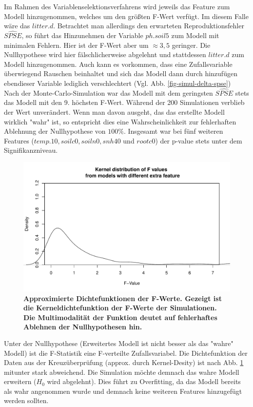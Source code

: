 Im Rahmen des Variablenselektionsverfahrens wird jeweils das Feature zum Modell hinzugenommen, welches um den größten F-Wert verfügt.
Im diesem Falle wäre das $litter.d$.
Betrachtet man allerdings den erwarteten Reproduktionsfehler $\widehat{SPSE}$, so führt das Hinzunehmen der Variable $ph.soil5$ zum Modell mit minimalen Fehlern.
Hier ist der F-Wert aber um $\approx 3,5$ geringer.
Die Nullhypothese wird hier fälschlicherweise abgelehnt und stattdessen $litter.d$ zum Modell hinzugenommen.
Auch kann es vorkommen, dass eine Zufallsvariable überwiegend Rauschen beinhaltet und sich das Modell dann durch hinzufügen ebendieser Variable lediglich verschlechtert (Vgl. Abb. \ref{fig-simul-delta-spse})
\\
Nach der Monte-Carlo-Simulation war das Modell mit dem geringsten $\widehat{SPSE}$ stets das Modell mit den 9. höchsten F-Wert.
Während der 200 Simulationen verblieb der Wert unverändert.
Wenn man davon ausgeht, das das erstellte Modell wirklich "wahr" ist, so entspricht dies eine Wahrscheinlichkeit zur fehlerhaften Ablehnung der Nullhypothese von $100\%$.
Insgesamt war bei fünf weiteren Features ($temp.10, soilc0, soiln0, snh40$ und $ rootc0$) der p-value stets unter dem Signifikanzniveau.
\\
\begin{figure}[htbp]
	\centering
	\includegraphics[width=\textwidth]{fig/simul/kernel.pdf}
	\caption{\bf{Approximierte Dichtefunktionen der F-Werte.} 
		Gezeigt ist die Kerneldichtefunktion der F-Werte der Simulationen.
		Die Multimodalität der Funktion deutet auf fehlerhaftes Ablehnen der Nullhypothesen hin.
	}
	\label{fig-simul-kernel}
\end{figure}
Unter der Nullhypothese (Erweitertes Modell ist nicht besser als das "wahre" Modell) ist die F-Statistik eine F-verteilte Zufallsvariabel.
Die Dichtefunktion der Daten aus der Kreuzüberprüfung (approx. durch Kernel-Desity) ist nach Abb. \ref{fig-simul-kernel} mitunter stark abweichend.
Die Simulation möchte demnach das wahre Modell erweitern ($H_0$ wird abgelehnt).
Dies führt zu Overfitting, da das Modell bereits als wahr angenommen wurde und demnach keine weiteren Features hinzugefügt werden sollten.

